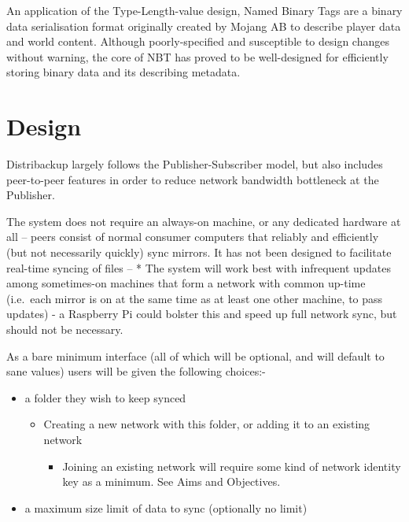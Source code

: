 \documentclass[12pt,a4paper,]{adreport}
\begin{document}
An application of the Type-Length-value design, Named Binary Tags are a
binary data serialisation format originally created by Mojang AB to
describe player data and world content. Although poorly-specified and
susceptible to design changes without warning, the core of NBT has
proved to be well-designed for efficiently storing binary data and its
describing metadata.

\chapter{Design}\label{design}

Distribackup largely follows the Publisher-Subscriber model, but also
includes peer-to-peer features in order to reduce network bandwidth
bottleneck at the Publisher.

The system does not require an always-on machine, or any dedicated
hardware at all -- peers consist of normal consumer computers that
reliably and efficiently (but not necessarily quickly) sync mirrors. It
has not been designed to facilitate real-time syncing of files -- * The
system will work best with infrequent updates among sometimes-on
machines that form a network with common up-time (i.e.~each mirror is on
at the same time as at least one other machine, to pass updates) - a
Raspberry Pi could bolster this and speed up full network sync, but
should not be necessary.

As a bare minimum interface (all of which will be optional, and will
default to sane values) users will be given the following choices:-

\begin{itemize}
\itemsep1pt\parskip0pt
\item
  a folder they wish to keep synced

  \begin{itemize}
  \itemsep1pt\parskip0pt
  \item
    Creating a new network with this folder, or adding it to an existing
    network

    \begin{itemize}
    \itemsep1pt\parskip0pt
    \item
      Joining an existing network will require some kind of network
      identity key as a minimum. See Aims and Objectives.
    \end{itemize}
  \end{itemize}
\item
  a maximum size limit of data to sync (optionally no limit)
\end{itemize}
\end{document}
